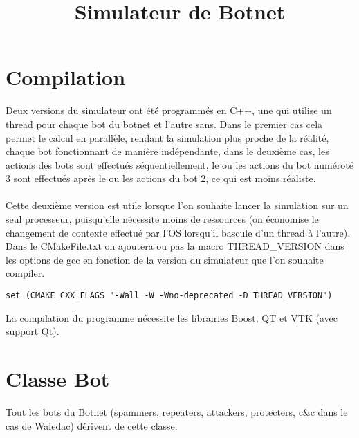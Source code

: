 \documentclass[11pt]{article}
\begin{document}
\title{Simulateur de Botnet}
\date{} 

\newcommand{\sautligneperso}{\newline\vspace{1mm}\newline}
\newcommand{\esp}[1]{\hspace*{#1mm}}

\maketitle
\section{Compilation}
Deux versions du simulateur ont été programmés en C++, une qui utilise un thread pour chaque bot du botnet et l'autre sans. Dans le premier cas cela permet le calcul en parallèle, rendant la simulation plus proche de la réalité, chaque bot fonctionnant de manière indépendante, dans le deuxième cas, les actions des bots sont effectués séquentiellement, le ou les actions du bot numéroté 3 sont effectués après le ou les actions du bot 2, ce qui est moins réaliste.\\\\ Cette deuxième version est utile lorsque l'on souhaite lancer la simulation sur un seul processeur, puisqu'elle nécessite moins de ressources (on économise le changement de contexte effectué par l'OS lorsqu'il bascule d'un thread à l'autre). Dans le CMakeFile.txt on ajoutera ou pas la macro THREAD\_VERSION dans les options de gcc en fonction de la version du simulateur que l'on souhaite compiler.  
\begin{center}
\begin{verbatim}
set (CMAKE_CXX_FLAGS "-Wall -W -Wno-deprecated -D THREAD_VERSION")
\end{verbatim}
\end{center}
La compilation du programme nécessite les librairies Boost, QT et VTK (avec support Qt). 
\newpage
\section{Classe Bot}
Tout les bots du Botnet (spammers, repeaters, attackers, protecters, c\&c dans le cas de Waledac) dérivent de cette classe.\\
\end{document}
